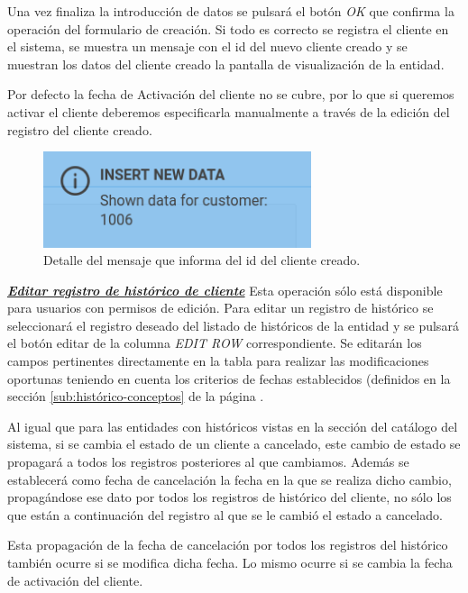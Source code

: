 Una vez finaliza la introducción de datos se pulsará el botón \emph{OK} que confirma la operación del formulario de creación. Si todo es correcto se registra el cliente en el sistema, se muestra un mensaje con el id del nuevo cliente creado y se muestran los datos del cliente creado la pantalla de visualización de la entidad.

Por defecto la fecha de Activación del cliente no se cubre, por lo que si queremos activar el cliente deberemos especificarla manualmente a través de la edición del registro del cliente creado.


\begin{figure}[H]
  \centering
  \includegraphics[width=0.70\textwidth]{imaxes/mensaje-id-cliente.png}
  \caption{Detalle del mensaje que informa del id del cliente creado.}
  \label{fig:mensaje-id-cliente}
\end{figure}


\underline{\textsl{\textbf{Editar registro de histórico de cliente}}}\newline
Esta operación sólo está disponible para usuarios con permisos de edición.
Para editar un registro de histórico se seleccionará el registro deseado del listado de históricos de la entidad y se pulsará el botón editar de la columna \textit{EDIT ROW} correspondiente. Se editarán los campos pertinentes directamente en la tabla para realizar las modificaciones oportunas teniendo en cuenta los criterios de fechas establecidos (definidos en la sección \ref{sub:histórico-conceptos} de la página \pageref{sub:histórico-conceptos}.

Al igual que para las entidades con históricos vistas en la sección del catálogo del sistema, si se cambia el estado de un cliente a cancelado, este cambio de estado se propagará a todos los registros posteriores al que cambiamos. Además se establecerá como fecha de cancelación la fecha en la que se realiza dicho cambio, propagándose ese dato por todos los registros de histórico del cliente, no sólo los que están a continuación del registro al que se le cambió el estado a cancelado.

Esta propagación de la fecha de cancelación por todos los registros del histórico  también ocurre si se modifica dicha fecha. Lo mismo ocurre si se cambia la fecha de activación del cliente.

